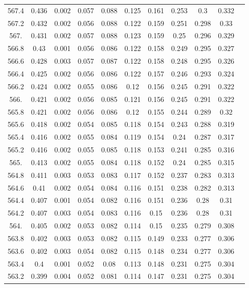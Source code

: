 \documentclass[12pt]{ctexart}
\numberwithin{equation}{section}
\begin{document}
\begin{longtable}{ccccccccccc}
567.4	&	0.436	&	0.002	&	0.057	&	0.088	&	0.125	&	0.161	&	0.253	&	0.3	&	0.332	\\
567.2	&	0.432	&	0.002	&	0.056	&	0.088	&	0.122	&	0.159	&	0.251	&	0.298	&	0.33	\\
567.	&	0.431	&	0.002	&	0.057	&	0.088	&	0.123	&	0.159	&	0.25	&	0.296	&	0.329	\\
566.8	&	0.43	&	0.001	&	0.056	&	0.086	&	0.122	&	0.158	&	0.249	&	0.295	&	0.327	\\
566.6	&	0.428	&	0.003	&	0.057	&	0.087	&	0.122	&	0.158	&	0.248	&	0.295	&	0.326	\\
566.4	&	0.425	&	0.002	&	0.056	&	0.086	&	0.122	&	0.157	&	0.246	&	0.293	&	0.324	\\
566.2	&	0.424	&	0.002	&	0.055	&	0.086	&	0.12	&	0.156	&	0.245	&	0.291	&	0.322	\\
566.	&	0.421	&	0.002	&	0.056	&	0.085	&	0.121	&	0.156	&	0.245	&	0.291	&	0.322	\\
565.8	&	0.421	&	0.002	&	0.056	&	0.086	&	0.12	&	0.155	&	0.244	&	0.289	&	0.32	\\
565.6	&	0.418	&	0.002	&	0.054	&	0.085	&	0.118	&	0.154	&	0.243	&	0.288	&	0.319	\\
565.4	&	0.416	&	0.002	&	0.055	&	0.084	&	0.119	&	0.154	&	0.24	&	0.287	&	0.317	\\
565.2	&	0.416	&	0.002	&	0.055	&	0.085	&	0.118	&	0.153	&	0.241	&	0.285	&	0.316	\\
565.	&	0.413	&	0.002	&	0.055	&	0.084	&	0.118	&	0.152	&	0.24	&	0.285	&	0.315	\\
564.8	&	0.411	&	0.003	&	0.053	&	0.083	&	0.117	&	0.152	&	0.237	&	0.283	&	0.313	\\
564.6	&	0.41	&	0.002	&	0.054	&	0.084	&	0.116	&	0.151	&	0.238	&	0.282	&	0.313	\\
564.4	&	0.407	&	0.001	&	0.054	&	0.082	&	0.116	&	0.151	&	0.236	&	0.28	&	0.31	\\
564.2	&	0.407	&	0.003	&	0.054	&	0.083	&	0.116	&	0.15	&	0.236	&	0.28	&	0.31	\\
564.	&	0.405	&	0.002	&	0.053	&	0.082	&	0.114	&	0.15	&	0.235	&	0.279	&	0.308	\\
563.8	&	0.402	&	0.003	&	0.053	&	0.082	&	0.115	&	0.149	&	0.233	&	0.277	&	0.306	\\
563.6	&	0.402	&	0.003	&	0.054	&	0.082	&	0.115	&	0.148	&	0.234	&	0.277	&	0.306	\\
563.4	&	0.4	&	0.001	&	0.052	&	0.08	&	0.113	&	0.148	&	0.231	&	0.275	&	0.304	\\
563.2	&	0.399	&	0.004	&	0.052	&	0.081	&	0.114	&	0.147	&	0.231	&	0.275	&	0.304	\\

\end{longtable}
\end{document}
